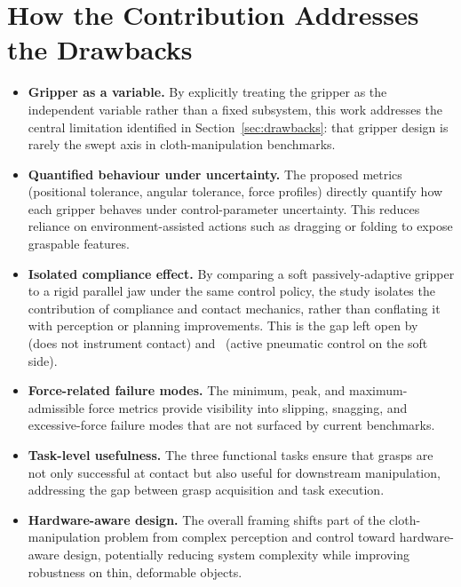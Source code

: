 \documentclass[10pt,letterpaper]{article}
\begin{document}
\section{How the Contribution Addresses the Drawbacks}
\label{sec:addresses}
\begin{itemize}[leftmargin=*,nosep]
    \item \textbf{Gripper as a variable.} By explicitly treating the
          gripper as the independent variable rather than a fixed
          subsystem, this work addresses the central limitation
          identified in Section~\ref{sec:drawbacks}: that gripper
          design is rarely the swept axis in cloth-manipulation
          benchmarks.
    \item \textbf{Quantified behaviour under uncertainty.} The
          proposed metrics (positional tolerance, angular tolerance,
          force profiles) directly quantify how each gripper behaves
          under control-parameter uncertainty. This reduces reliance
          on environment-assisted actions such as dragging or folding
          to expose graspable features.
    \item \textbf{Isolated compliance effect.} By comparing a soft
          passively-adaptive gripper to a rigid parallel jaw under
          the same control policy, the study isolates the
          contribution of compliance and contact mechanics, rather
          than conflating it with perception or planning improvements.
          This is the gap left open by~\cite{Clark2023} (does not
          instrument contact) and~\cite{Teeple2022} (active pneumatic
          control on the soft side).
    \item \textbf{Force-related failure modes.} The minimum, peak, and
          maximum-admissible force metrics provide visibility into
          slipping, snagging, and excessive-force failure modes that
          are not surfaced by current benchmarks.
    \item \textbf{Task-level usefulness.} The three functional tasks
          ensure that grasps are not only successful at contact but
          also useful for downstream manipulation, addressing the gap
          between grasp acquisition and task execution.
    \item \textbf{Hardware-aware design.} The overall framing shifts
          part of the cloth-manipulation problem from complex
          perception and control toward hardware-aware design,
          potentially reducing system complexity while improving
          robustness on thin, deformable objects.
\end{itemize}
\end{document}
